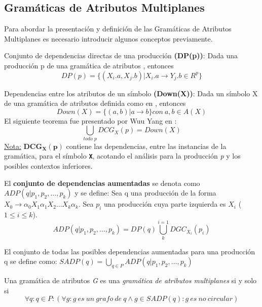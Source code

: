 \documentclass[runningheads,a4paper]{llncs}
\newcommand{\textbtt}[1]{\texttt{\textbf{#1}}}
\begin{document}
\subsection{Gramáticas de Atributos Multiplanes}
\label{def:MAG}
\vspace{-0.22cm}
Para abordar la presentación y definición de las Gramáticas de Atributos Multiplanes es necesario introducir algunos conceptos previamente.

Conjunto de dependencias directas de una producción \textbf{(DP(p))}:
Dada una producción p de una gramática de atributos 
, entonces\\
$$
DP(p) = \{(X_{i}.a, X_{j}.b) | X_{i}.a \rightarrow Y_{j}.b \in R^{p} \}
$$

Dependencias entre los atributos de un símbolo \textbf{(Down(X))}:
Dada un símbolo X de una gramática de atributos definida como en 
, entonces\\
$$
Down(X) = \{(a,b) | a \rightarrow b \} con\ a,b \in A(X)
$$
El siguiente teorema fue presentado por Wuu Yang en \cite{wuu-yang1}:\\
$$
\bigcup\limits_{\textit{todo p}}{DCG_{X} (p) = Down (X)}
$$
\underline{Nota:} $\textbf{DCG}_{\textbf{X}}(\textbf{p})$ contiene las dependencias, entre las instancias de la gramática, para el símbolo \textbtt{X}, acotando el análisis para la producción \textit{p} y los posibles contextos inferiores.

El \textbf{conjunto de dependencias aumentadas} se denota como \\$ADP (q | p_{1}, p_{2}, \dots, p_{k})$ y se define:
Sea q una producción de la forma $X_{0}\rightarrow \alpha_{0} X_{1} \alpha_{1} X_{2} \dots X_{k} \alpha_{k}$. Sea $p_{i}$ una producción cuya parte izquierda es $X_{i}$ ($1\leqslant i \leqslant k$). 
$$
ADP (q | p_{1}, p_{2}, \dots, p_{k}) = DP(q) \bigcup\limits_{k}^{i=1}{DGC_{X_{i}}} (p_{i})
$$

El conjunto de todas las posibles dependencias aumentadas para una producción q se define como:
$
SADP(q) = \bigcup\limits_{q\in P}{ADP (q | p_{1}, p_{2}, \dots, p_{k})} 
$

\begin{definition}
Una gramática de atributos \textit{G} es una \textit{gramática de atributos multiplanes} si y solo si 
$$
\forall q : q \in P: (\forall g:g\ es\ un\ grafo\ de\ q \wedge g \in SADP(q) : g\ es\ no\ circular) 
$$
\end{definition}
\end{document}
